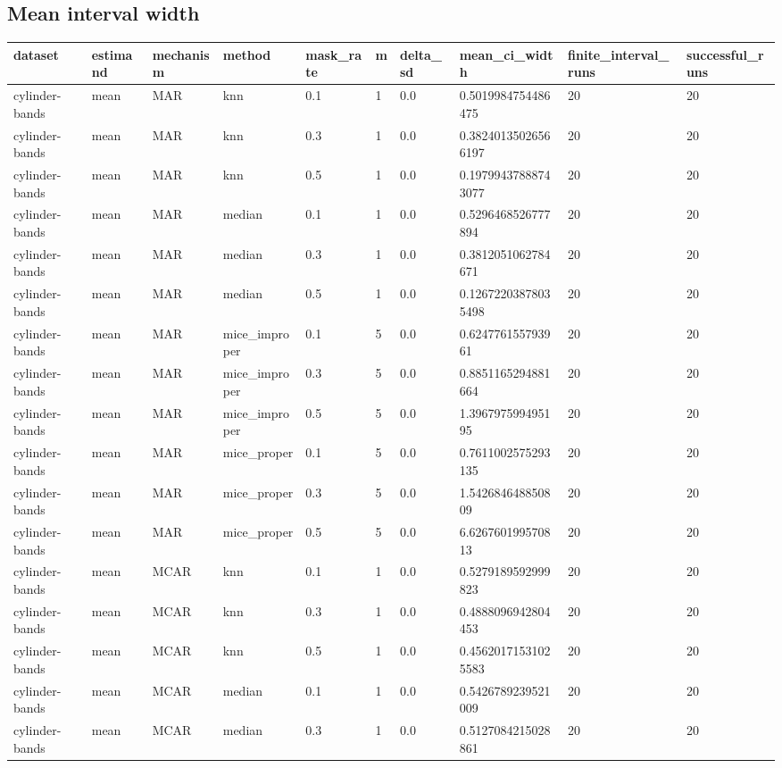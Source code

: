 \subsection*{Mean interval width}

\begin{tabular}{llllllllll}
\hline
dataset & estimand & mechanism & method & mask\_rate & m & delta\_sd & mean\_ci\_width & finite\_interval\_runs & successful\_runs \\
\hline
cylinder-bands & mean & MAR & knn & 0.1 & 1 & 0.0 & 0.5019984754486475 & 20 & 20 \\
cylinder-bands & mean & MAR & knn & 0.3 & 1 & 0.0 & 0.38240135026566197 & 20 & 20 \\
cylinder-bands & mean & MAR & knn & 0.5 & 1 & 0.0 & 0.19799437888743077 & 20 & 20 \\
cylinder-bands & mean & MAR & median & 0.1 & 1 & 0.0 & 0.5296468526777894 & 20 & 20 \\
cylinder-bands & mean & MAR & median & 0.3 & 1 & 0.0 & 0.3812051062784671 & 20 & 20 \\
cylinder-bands & mean & MAR & median & 0.5 & 1 & 0.0 & 0.12672203878035498 & 20 & 20 \\
cylinder-bands & mean & MAR & mice\_improper & 0.1 & 5 & 0.0 & 0.624776155793961 & 20 & 20 \\
cylinder-bands & mean & MAR & mice\_improper & 0.3 & 5 & 0.0 & 0.8851165294881664 & 20 & 20 \\
cylinder-bands & mean & MAR & mice\_improper & 0.5 & 5 & 0.0 & 1.396797599495195 & 20 & 20 \\
cylinder-bands & mean & MAR & mice\_proper & 0.1 & 5 & 0.0 & 0.7611002575293135 & 20 & 20 \\
cylinder-bands & mean & MAR & mice\_proper & 0.3 & 5 & 0.0 & 1.542684648850809 & 20 & 20 \\
cylinder-bands & mean & MAR & mice\_proper & 0.5 & 5 & 0.0 & 6.626760199570813 & 20 & 20 \\
cylinder-bands & mean & MCAR & knn & 0.1 & 1 & 0.0 & 0.5279189592999823 & 20 & 20 \\
cylinder-bands & mean & MCAR & knn & 0.3 & 1 & 0.0 & 0.4888096942804453 & 20 & 20 \\
cylinder-bands & mean & MCAR & knn & 0.5 & 1 & 0.0 & 0.45620171531025583 & 20 & 20 \\
cylinder-bands & mean & MCAR & median & 0.1 & 1 & 0.0 & 0.5426789239521009 & 20 & 20 \\
cylinder-bands & mean & MCAR & median & 0.3 & 1 & 0.0 & 0.5127084215028861 & 20 & 20 \\

\end{tabular}
